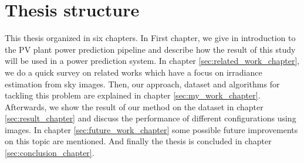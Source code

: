 \section{Thesis structure}
This thesis organized in six chapters. In First chapter, we give in introduction to the PV plant power prediction pipeline and describe how the result of this study will be used in a power prediction system. In chapter \ref{sec:related_work_chapter}, we do a quick survey on related works which have a focus on irradiance estimation from sky images. Then, our approach, dataset and algorithms for tackling this problem are explained in chapter \ref{sec:my_work_chapter}. Afterwards, we show the result of our method on the dataset in chapter \ref{sec:result_chapter} and discuss the performance of different configurations using images. In chapter \ref{sec:future_work_chapter} some possible future improvements on this topic are mentioned. And finally the thesis is concluded in chapter \ref{sec:conclusion_chapter}.
